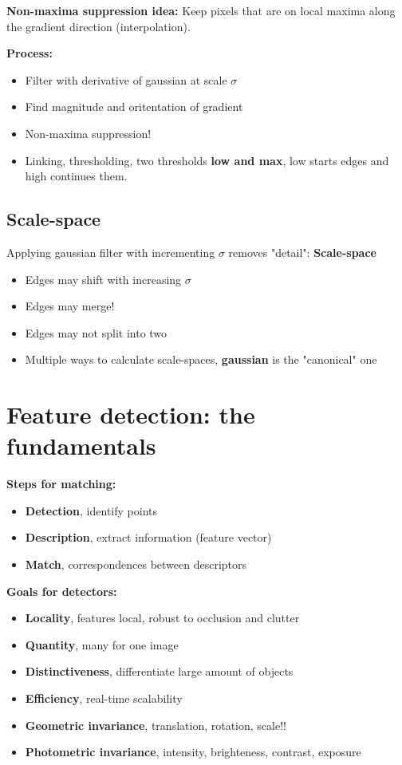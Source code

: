 \textbf{Non-maxima suppression idea:} Keep pixels that are on local maxima along the gradient direction (interpolation).

\textbf{Process:}

\begin{itemize}
    \item Filter with derivative of gaussian at scale $\sigma$
    \item Find magnitude and oritentation of gradient
    \item Non-maxima suppression!
    \item Linking, thresholding, two thresholds \textbf{low and max}, low starts edges and high continues them.
\end{itemize}

\subsection{Scale-space}

Applying gaussian filter with incrementing $\sigma$ removes "detail": \textbf{Scale-space}

\begin{itemize}
    \item Edges may shift with increasing $\sigma$
    \item Edges may merge!
    \item Edges may not split into two
    \item Multiple ways to calculate scale-spaces, \textbf{gaussian} is the "canonical" one
\end{itemize}

\section{Feature detection: the fundamentals}

\textbf{Steps for matching:}

\begin{itemize}
    \item \textbf{Detection}, identify points
    \item \textbf{Description}, extract information (feature vector)
    \item \textbf{Match}, correspondences between descriptors
\end{itemize}

\textbf{Goals for detectors:}

\begin{itemize}
    \item \textbf{Locality}, features local, robust to occlusion and clutter
    \item \textbf{Quantity}, many for one image
    \item \textbf{Distinctiveness}, differentiate large amount of objects
    \item \textbf{Efficiency}, real-time scalability
    \item \textbf{Geometric invariance}, translation, rotation, scale!!
    \item \textbf{Photometric invariance}, intensity, brighteness, contrast, exposure
\end{itemize}

